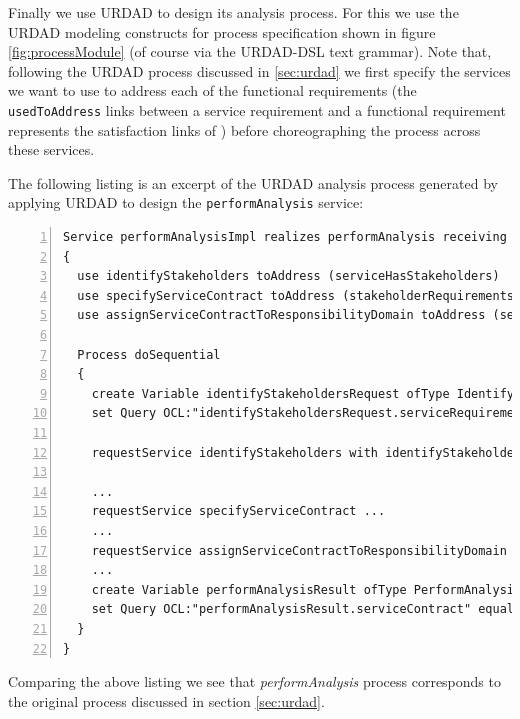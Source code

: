 Finally we use URDAD to design its analysis process. For this we use the URDAD modeling constructs for process specification shown in figure \ref{fig:processModule} (of course via the URDAD-DSL text grammar). Note that, following the URDAD process discussed in \ref{sec:urdad} we first specify the services we want to use to address each of the functional requirements (the \verb+usedToAddress+ links between a service requirement and a functional requirement represents the satisfaction links of \cite{ramesh_toward_2001}) before choreographing the process across these services. 

The following listing is an excerpt of the URDAD analysis process generated by applying URDAD to design the \verb+performAnalysis+ service:
\lstset{language=urdad,caption=Specifying the performAnalysis service in the textual URDAD DSL syntax.,label=serviceTextSyntax}
\begin{lstlisting}[numbers=left,escapechar=|]
Service performAnalysisImpl realizes performAnalysis receiving Variable performAnalysisRequest ofType PerformAnalysisRequest 
{
  use identifyStakeholders toAddress (serviceHasStakeholders) 
  use specifyServiceContract toAddress (stakeholderRequirementsConsistent serviceContractSpecified)
  use assignServiceContractToResponsibilityDomain toAddress (serviceContractAssignedToResponsibilityDomain)
 
  Process doSequential
  {
    create Variable identifyStakeholdersRequest ofType IdentifyStakeholdersRequest
    set Query OCL:"identifyStakeholdersRequest.serviceRequirements" equalTo Query OCL:"performAnalysisRequest.serviceRequirements"
    
    requestService identifyStakeholders with identifyStakeholdersRequest yielding Variable identifyStakeholdersResult ofType IdentifyStakeholdersResult on NoStakeholdersException raiseException NoStakeholdersException

    ...
    requestService specifyServiceContract ...
    ...
    requestService assignServiceContractToResponsibilityDomain ...
    ...
    create Variable performAnalysisResult ofType PerformAnalysisResult
    set Query OCL:"performAnalysisResult.serviceContract" equalTo Query OCL:"specifyServiceContractResult.serviceContract"  
  }                              
}
\end{lstlisting}

Comparing the above listing we see that \emph{performAnalysis} process corresponds to the original process discussed in section \ref{sec:urdad}.